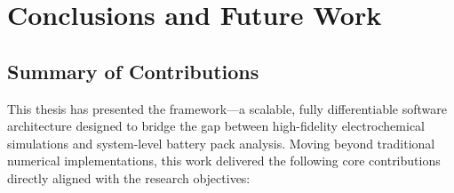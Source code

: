 \chapter{Conclusions and Future Work}
\label{ch:conclusion}

\section{Summary of Contributions}

This thesis has presented the \VIBE{} framework---a scalable, fully differentiable software architecture designed to bridge the gap between high-fidelity electrochemical simulations and system-level battery pack analysis. Moving beyond traditional numerical implementations, this work delivered the following core contributions directly aligned with the research objectives:

